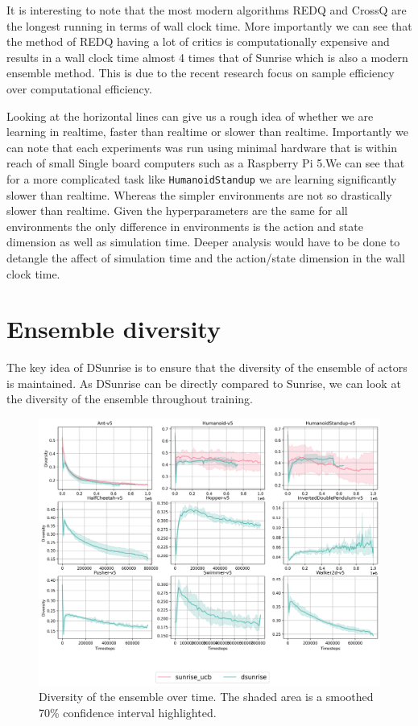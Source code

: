 It is interesting to note that the most modern algorithms REDQ and CrossQ are the longest running in terms of wall clock time. More importantly we can see that the method of REDQ having a lot of critics is computationally expensive and results in a wall clock time almost 4 times that of Sunrise which is also a modern ensemble method. This is due to the recent research focus on sample efficiency over computational efficiency.

Looking at the horizontal lines can give us a rough idea of whether we are learning in realtime, faster than realtime or slower than realtime. Importantly we can note that each experiments was run using minimal hardware that is within reach of small Single board computers such as a Raspberry Pi 5.We can see that for a more complicated task like \texttt{HumanoidStandup} we are learning significantly slower than realtime. Whereas the simpler environments are not so drastically slower than realtime. Given the hyperparameters are the same for all environments the only difference in environments is the action and state dimension as well as simulation time. Deeper analysis would have to be done to detangle the affect of simulation time and the action/state dimension in the wall clock time.

\section{Ensemble diversity}
The key idea of DSunrise is to ensure that the diversity of the ensemble of actors is maintained. As DSunrise can be directly compared to Sunrise, we can look at the diversity of the ensemble throughout training.

\begin{figure}
    \centering
    \includegraphics[width=1\textwidth]{figures/diversity_results.png}
    \caption{Diversity of the ensemble over time. The shaded area is a smoothed 70\% confidence interval highlighted.}
    \label{fig:diversity}
\end{figure}

